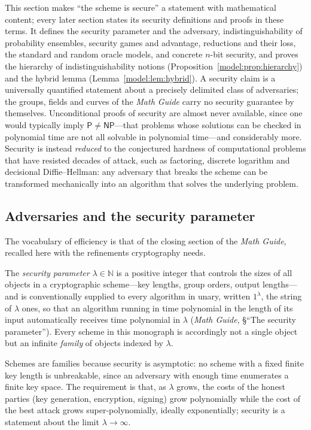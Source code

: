 \documentclass[11pt,a4paper]{article}
\theoremstyle{definition}
\theoremstyle{remark}
\newcommand{\N}{\ensuremath{\mathbb{N}}}
\begin{document}
This section makes ``the scheme is secure'' a statement with
mathematical content; every later section states its security
definitions and proofs in these terms. It defines the security
parameter and the adversary, indistinguishability of probability
ensembles, security games and advantage, reductions and their loss, the
standard and random oracle models, and concrete \(n\)-bit security, and
proves the hierarchy of indistinguishability notions
(Proposition~\ref{model:prop:hierarchy}) and the hybrid lemma
(Lemma~\ref{model:lem:hybrid}). A security claim is a universally
quantified statement about a precisely delimited class of adversaries;
the groups, fields and curves of the \emph{Math Guide} carry no
security guarantee by themselves. Unconditional proofs of security are
almost never available, since one would typically imply
\(\mathsf{P} \neq \mathsf{NP}\)---that problems whose solutions can be
checked in polynomial time are not all solvable in polynomial
time---and considerably more. Security is instead \emph{reduced} to
the conjectured hardness of computational problems that have resisted
decades of attack, such as factoring, discrete logarithm and
decisional Diffie--Hellman: any adversary that breaks the scheme can
be transformed mechanically into an algorithm that solves the
underlying problem.

\subsection{Adversaries and the security parameter}
\label{model:subsec:adversaries}

The vocabulary of efficiency is that of the closing section of the
\emph{Math Guide}, recalled here with the refinements cryptography
needs.

The \emph{security parameter} \(\lambda \in \N\) is a positive integer
that controls the sizes of all objects in a cryptographic scheme---key
lengths, group orders, output lengths---and is conventionally supplied
to every algorithm in unary, written \(1^\lambda\), the string of
\(\lambda\) ones, so that an algorithm running in time polynomial in
the length of its input automatically receives time polynomial in
\(\lambda\) (\emph{Math Guide}, \S``The security parameter''). Every
scheme in this monograph is accordingly not a single object but an
infinite \emph{family} of objects indexed by \(\lambda\).

Schemes are families because security is asymptotic: no scheme with a
fixed finite key length is unbreakable, since an adversary with enough
time enumerates a finite key space. The requirement is that, as
\(\lambda\) grows, the costs of the honest parties (key generation,
encryption, signing) grow polynomially while the cost of the best
attack grows super-polynomially, ideally exponentially; security is a
statement about the limit \(\lambda \to \infty\).
\end{document}

